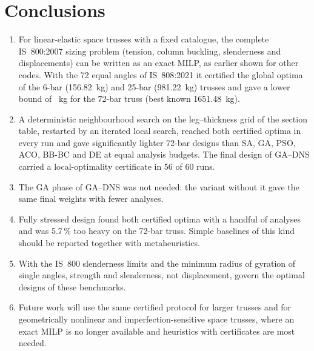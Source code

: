 \documentclass[lineno,pdflatex,sn-mathphys-num]{sn-jnl}
\begin{document}
\section{Conclusions}
\label{sec:conclusion}
\begin{enumerate}
\item For linear-elastic space trusses with a fixed catalogue, the complete
      IS~800:2007 sizing problem (tension, column buckling, slenderness and
      displacements) can be written as an exact MILP, as earlier shown for other
      codes. With the 72 equal angles of IS~808:2021 it certified the global
      optima of the 6-bar (156.82~kg) and 25-bar (981.22~kg) trusses and gave a
      lower bound of \LBsvt~kg for the 72-bar truss (best known 1651.48~kg).
\item A deterministic neighbourhood search on the leg--thickness grid of the
      section table, restarted by an iterated local search, reached both
      certified optima in every run and gave significantly lighter 72-bar
      designs than SA, GA, PSO, ACO, BB-BC and DE at equal analysis budgets.
      The final design of GA--DNS carried a local-optimality certificate in 56 of 60 runs.
\item The GA phase of GA--DNS was not needed: the variant without it gave the
      same final weights with fewer analyses.
\item Fully stressed design found both certified optima with a handful of
      analyses and was 5.7\,\% too heavy on the 72-bar truss. Simple baselines
      of this kind should be reported together with metaheuristics.
\item With the IS~800 slenderness limits and the minimum radius of gyration of
      single angles, strength and slenderness, not displacement, govern the
      optimal designs of these benchmarks.
\item Future work will use the same certified protocol for larger trusses and
      for geometrically nonlinear and imperfection-sensitive space trusses,
      where an exact MILP is no longer available and heuristics with
      certificates are most needed.
\end{enumerate}

\backmatter
\end{document}
